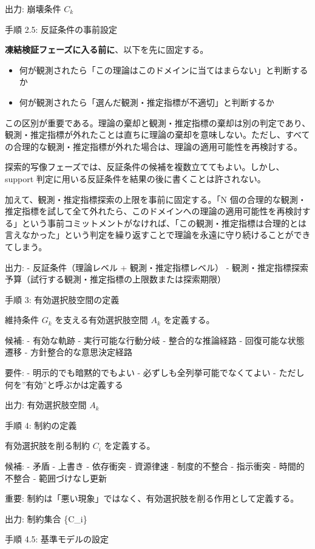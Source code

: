 \documentclass[12pt,a4paper]{article}
\begin{document}
出力: 崩壊条件 \(C_{k}\)

手順 2.5: 反証条件の事前設定

\textbf{凍結検証フェーズに入る前に}、以下を先に固定する。

\begin{itemize}
\tightlist
\item
  何が観測されたら「この理論はこのドメインに当てはまらない」と判断するか
\item
  何が観測されたら「選んだ観測・推定指標が不適切」と判断するか
\end{itemize}

この区別が重要である。理論の棄却と観測・推定指標の棄却は別の判定であり、観測・推定指標が外れたことは直ちに理論の棄却を意味しない。ただし、すべての合理的な観測・推定指標が外れた場合は、理論の適用可能性を再検討する。

探索的写像フェーズでは、反証条件の候補を複数立ててもよい。しかし、support 判定に用いる反証条件を結果の後に書くことは許されない。

加えて、観測・推定指標探索の上限を事前に固定する。「N 個の合理的な観測・推定指標を試して全て外れたら、このドメインへの理論の適用可能性を再検討する」という事前コミットメントがなければ、「この観測・推定指標は合理的とは言えなかった」という判定を繰り返すことで理論を永遠に守り続けることができてしまう。

出力: - 反証条件（理論レベル + 観測・推定指標レベル） - 観測・推定指標探索予算（試行する観測・推定指標の上限数または探索期限）

手順 3: 有効選択肢空間の定義

維持条件 \(G_{k}\) を支える有効選択肢空間 \(A_{k}\) を定義する。

候補: - 有効な軌跡 - 実行可能な行動分岐 - 整合的な推論経路 - 回復可能な状態遷移 - 方針整合的な意思決定経路

要件: - 明示的でも暗黙的でもよい - 必ずしも全列挙可能でなくてよい - ただし何を''有効''と呼ぶかは定義する

出力: 有効選択肢空間 \(A_{k}\)

手順 4: 制約の定義

有効選択肢を削る制約 \(C_{i}\) を定義する。

候補: - 矛盾 - 上書き - 依存衝突 - 資源律速 - 制度的不整合 - 指示衝突 - 時間的不整合 - 範囲づけなし更新

重要: 制約は「悪い現象」ではなく、有効選択肢を削る作用として定義する。

出力: 制約集合 \{C\_i\}

手順 4.5: 基準モデルの設定
\end{document}
